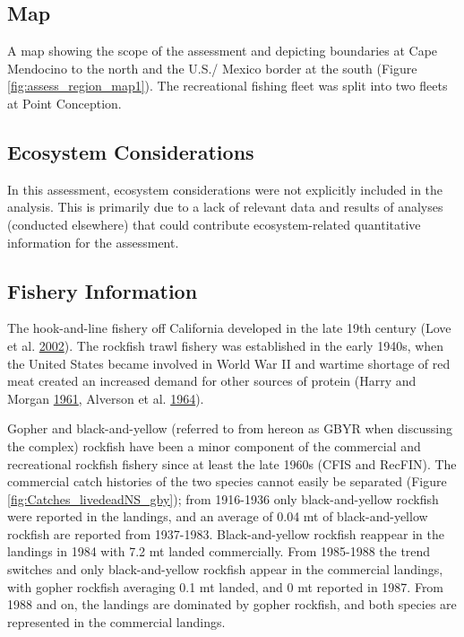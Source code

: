 \documentclass[12pt,]{article}
\begin{document}
\subsection{Map}\label{map}

A map showing the scope of the assessment and depicting boundaries at
Cape Mendocino to the north and the U.S./ Mexico border at the south
(Figure \ref{fig:assess_region_map1}). The recreational fishing fleet
was split into two fleets at Point Conception.

\subsection{Ecosystem Considerations}\label{ecosystem-considerations-1}

In this assessment, ecosystem considerations were not explicitly
included in the analysis. This is primarily due to a lack of relevant
data and results of analyses (conducted elsewhere) that could contribute
ecosystem-related quantitative information for the assessment.

\subsection{Fishery Information}\label{fishery-information}

The hook-and-line fishery off California developed in the late 19th
century (Love et al. \protect\hyperlink{ref-Love2002}{2002}). The
rockfish trawl fishery was established in the early 1940s, when the
United States became involved in World War II and wartime shortage of
red meat created an increased demand for other sources of protein (Harry
and Morgan \protect\hyperlink{ref-Harry1961}{1961}, Alverson et al.
\protect\hyperlink{ref-Alverson1964}{1964}).

Gopher and black-and-yellow (referred to from hereon as GBYR when
discussing the complex) rockfish have been a minor component of the
commercial and recreational rockfish fishery since at least the late
1960s (CFIS and RecFIN). The commercial catch histories of the two
species cannot easily be separated (Figure
\ref{fig:Catches_livedeadNS_gby}); from 1916-1936 only black-and-yellow
rockfish were reported in the landings, and an average of 0.04 mt of
black-and-yellow rockfish are reported from 1937-1983. Black-and-yellow
rockfish reappear in the landings in 1984 with 7.2 mt landed
commercially. From 1985-1988 the trend switches and only
black-and-yellow rockfish appear in the commercial landings, with gopher
rockfish averaging 0.1 mt landed, and 0 mt reported in 1987. From 1988
and on, the landings are dominated by gopher rockfish, and both species
are represented in the commercial landings.
\end{document}
